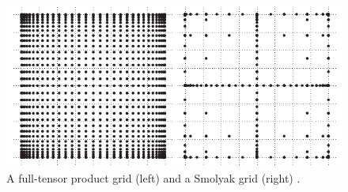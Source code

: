 \begin{figure}
  \centering
  \includegraphics[width=0.9\linewidth]{include/assets/integration-grids.pdf}
  \vspace{-1.0em}
  \caption{A full-tensor product grid (left) and a Smolyak grid (right) \cite{eldred2008}.}
  \vspace{-1.5em}
\end{figure}

